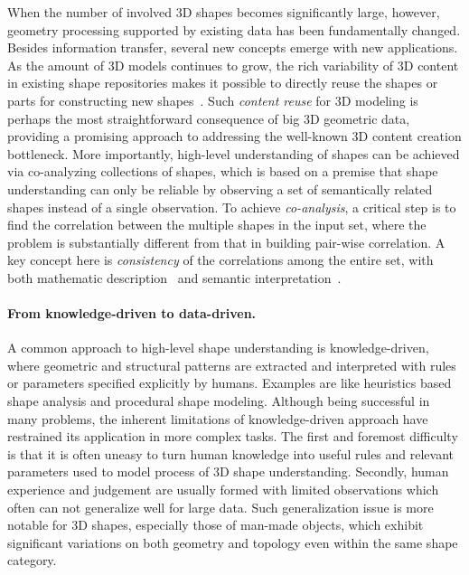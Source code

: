 When the number of involved 3D shapes becomes significantly large, however, geometry processing supported by existing data has been fundamentally changed.
Besides information transfer, several new concepts emerge with new applications.
As the amount of 3D models continues to grow, the rich variability of 3D content in existing shape repositories makes it possible to directly reuse the shapes
or parts for constructing new shapes~\cite{Funkhouser:2004:MBE}. Such \emph{content reuse} for 3D modeling is perhaps the most straightforward consequence of big 3D geometric data,
providing a promising approach to addressing the well-known 3D content creation bottleneck.
More importantly, high-level understanding of shapes can be achieved via co-analyzing collections of shapes, which is based on
a premise that shape understanding can only be reliable by observing a set of semantically related shapes instead of a single observation.
To achieve \emph{co-analysis}, a critical step is to find the correlation between the multiple shapes in the input set, where the problem is substantially different from that in building pair-wise correlation. A key concept here is \emph{consistency} of the correlations among the entire set, with both mathematic description~\cite{Huang:2013:SDP} and semantic interpretation~\cite{Wang:2012:ACS}.


\paragraph*{From knowledge-driven to data-driven.}
A common approach to high-level shape understanding is knowledge-driven,
where geometric and structural patterns are extracted and interpreted with rules or parameters specified explicitly by humans.
Examples are like heuristics based shape analysis and procedural shape modeling.
Although being successful in many problems, the inherent limitations of knowledge-driven approach have restrained its application in more complex tasks.
The first and foremost difficulty is that it is often uneasy to turn human knowledge
into useful rules and relevant parameters used to model process of 3D shape understanding.
Secondly, human experience and judgement are usually formed with limited observations which often
can not generalize well for large data. Such generalization issue is more notable for
3D shapes, especially those of man-made objects, which exhibit significant variations on both geometry and topology
even within the same shape category.%

